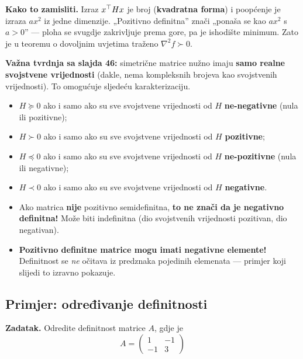 \textbf{Kako to zamisliti.} Izraz $x^{\top} Hx$ je broj (\textbf{kvadratna forma}) i
poopćenje je izraza $a x^2$ iz jedne dimenzije. „Pozitivno definitna” znači
„ponaša se kao $ax^2$ s $a > 0$” --- ploha se svugdje zakrivljuje prema gore,
pa je ishodište minimum. Zato je u teoremu o dovoljnim uvjetima traženo
$\nabla^2f \succ 0$.

\textbf{Važna tvrdnja sa slajda 46:} simetrične matrice nužno imaju
\textbf{samo realne svojstvene vrijednosti} (dakle, nema kompleksnih brojeva
kao svojstvenih vrijednosti). To omogućuje sljedeću karakterizaciju.

\begin{teorem}
\begin{itemize}
  \item $H \succeq 0$ ako i samo ako su sve svojstvene vrijednosti od $H$
        \textbf{ne-negativne} (nula ili pozitivne);
  \item $H \succ 0$ ako i samo ako su sve svojstvene vrijednosti od $H$
        \textbf{pozitivne};
  \item $H \preceq 0$ ako i samo ako su sve svojstvene vrijednosti od $H$
        \textbf{ne-pozitivne} (nula ili negativne);
  \item $H \prec 0$ ako i samo ako su sve svojstvene vrijednosti od $H$
        \textbf{negativne}.
\end{itemize}
\end{teorem}

\begin{napomena}
\begin{itemize}
  \item Ako matrica \textbf{nije} pozitivno semidefinitna, \textbf{to ne znači
        da je negativno definitna!} Može biti indefinitna (dio svojstvenih
        vrijednosti pozitivan, dio negativan).
  \item \textbf{Pozitivno definitne matrice mogu imati negativne elemente!}
        Definitnost se \emph{ne} očitava iz predznaka pojedinih elemenata ---
        primjer koji slijedi to izravno pokazuje.
\end{itemize}
\end{napomena}

\subsection{Primjer: određivanje definitnosti}

\textbf{Zadatak.} Odredite definitnost matrice $A$, gdje je
\[
A = \begin{pmatrix} 1 & -1 \\ -1 & 3 \end{pmatrix}
\]

